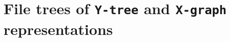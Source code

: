 \section{File trees of \texttt{Y-tree} and \texttt{X-graph} representations}
\label{apx:trees}

\hspace*{\fill}%
\begin{minipage}[t]{0.55\textwidth}
\end{minipage}
\hfill%
\begin{minipage}[t]{0.35\textwidth}
\end{minipage}
\hspace*{\fill}%